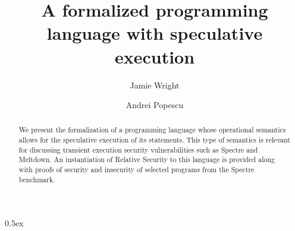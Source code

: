 \documentclass[11pt,a4paper]{article}
\begin{document}
\title{A formalized programming language with speculative execution}
\author{Jamie Wright \and Andrei Popescu}
\maketitle

\begin{abstract}
We present the formalization of a programming language whose operational semantics allows for the speculative execution of its statements. This type of semantics is relevant for discussing transient execution security vulnerabilities such as Spectre and Meltdown. An instantiation of Relative Security to this language is provided along with proofs of security and insecurity of selected programs from the Spectre benchmark. 
\end{abstract} 

\tableofcontents

\parindent 0pt\parskip 0.5ex



%
%

\cite{Concrete}
\cite{Cheang}




\end{document}

